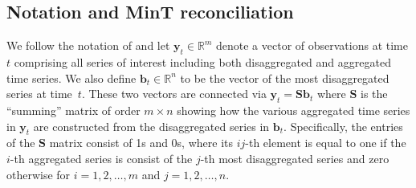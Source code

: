 \documentclass[twocolumn]{svjour3}
\begin{document}
\subsection{Notation and MinT reconciliation}

We follow the notation of \citet{Wick2018} and let $\bm{y}_t \in \mathbb{R}^m$ denote a vector of observations at time $t$ comprising all series of interest including both disaggregated and aggregated time series. We also define $\bm{b}_t \in \mathbb{R}^n$ to be the vector of the most disaggregated series at time~$t$. These two vectors are connected via $\bm{y}_t=\bm{S}\bm{b}_t$ where $\bm{S}$ is the ``summing'' matrix of order $m \times n$ showing how the various aggregated time series in $\bm{y}_t$ are constructed from the disaggregated series in $\bm{b}_t$. {\color{red} Specifically, the entries of the $\bm{S}$ matrix consist of 1s and 0s, where its $ij$-th element is equal to one if the $i$-th aggregated series is consist of the $j$-th most disaggregated series and zero otherwise for $i = 1, 2, \dots, m$ and $j = 1, 2, \dots, n$.} 
\end{document}
